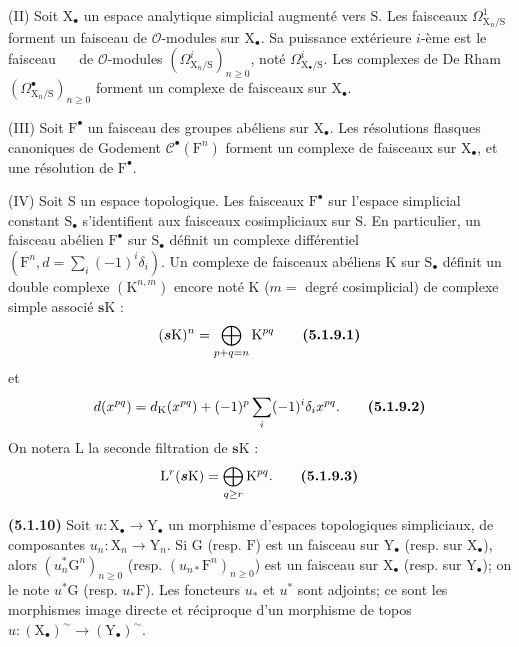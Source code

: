 \documentclass[11pt,leqno]{article}
\newcommand{\Page}[1]{\ifvmode\noindent\else\unskip\ \fi{\footnotesize\textcolor{gray}{[p.\,#1]}}\ \ignorespaces}
\begin{document}
(II) Soit \(\mathrm{X}_{\bullet}\) un espace analytique simplicial augmenté vers \(\mathrm{S}\). Les faisceaux \(\Omega^1_{\mathrm{X}_n/\mathrm{S}}\) forment un faisceau de \(\mathscr{O}\)-modules sur \(\mathrm{X}_{\bullet}\). Sa puissance extérieure \(i\)-ème est le faisceau
\Page{11}
de \(\mathscr{O}\)-modules \((\Omega^i_{\mathrm{X}_n/\mathrm{S}})_{n\geq0}\), noté \(\Omega^i_{\mathrm{X}_{\bullet}/\mathrm{S}}\). Les complexes de De Rham \((\Omega^{\bullet}_{\mathrm{X}_n/\mathrm{S}})_{n\geq0}\) forment un complexe de faisceaux sur \(\mathrm{X}_{\bullet}\).

(III) Soit \(\mathrm{F}^{\bullet}\) un faisceau des groupes abéliens sur \(\mathrm{X}_{\bullet}\). Les résolutions flasques canoniques de Godement \(\mathscr{C}^{\bullet}(\mathrm{F}^n)\) forment un complexe de faisceaux sur \(\mathrm{X}_{\bullet}\), et une résolution de \(\mathrm{F}^{\bullet}\).

(IV) Soit \(\mathrm{S}\) un espace topologique. Les faisceaux \(\mathrm{F}^{\bullet}\) sur l’espace simplicial constant \(\mathrm{S}_{\bullet}\) s’identifient aux faisceaux cosimpliciaux sur \(\mathrm{S}\). En particulier, un faisceau abélien \(\mathrm{F}^{\bullet}\) sur \(\mathrm{S}_{\bullet}\) définit un complexe différentiel \((\mathrm{F}^n,d=\sum\limits_i(-1)^i\delta_i)\). Un complexe de faisceaux abéliens \(\mathrm{K}\) sur \(\mathrm{S}_{\bullet}\) définit un double complexe \((\mathrm{K}^{n,m})\) encore noté \(\mathrm{K}\) (\(m=\) degré cosimplicial) de complexe simple associé \(\boldsymbol{s}\mathrm{K}\) :
\[
(\boldsymbol{s}\mathrm{K})^n
=\bigoplus_{p+q=n}\mathrm{K}^{pq}
\tag*{\textbf{(5.1.9.1)}}
\]
et
\[
d(x^{pq})=d_{\mathrm{K}}(x^{pq})
+(-1)^p\sum_i(-1)^i\delta_i x^{pq}.
\tag*{\textbf{(5.1.9.2)}}
\]
On notera \(\mathrm{L}\) la seconde filtration de \(\boldsymbol{s}\mathrm{K}\) :
\[
\mathrm{L}^r(\boldsymbol{s}\mathrm{K})
=\bigoplus_{q\geq r}\mathrm{K}^{pq}.
\tag*{\textbf{(5.1.9.3)}}
\]

\textbf{(5.1.10)} Soit \(u:\mathrm{X}_{\bullet}\to\mathrm{Y}_{\bullet}\) un morphisme d’espaces topologiques simpliciaux, de composantes \(u_n:\mathrm{X}_n\to\mathrm{Y}_n\). Si \(\mathrm{G}\) (resp. \(\mathrm{F}\)) est un faisceau sur \(\mathrm{Y}_{\bullet}\) (resp. sur \(\mathrm{X}_{\bullet}\)), alors \((u_n^*\mathrm{G}^n)_{n\geq0}\) (resp. \((u_{n*}\mathrm{F}^n)_{n\geq0}\)) est un faisceau sur \(\mathrm{X}_{\bullet}\) (resp. sur \(\mathrm{Y}_{\bullet}\)); on le note \(u^*\mathrm{G}\) (resp. \(u_*\mathrm{F}\)). Les foncteurs \(u_*\) et \(u^*\) sont adjoints; ce sont les morphismes image directe et réciproque d’un morphisme de topos \(u:(\mathrm{X}_{\bullet})^{\sim}\to(\mathrm{Y}_{\bullet})^{\sim}\).
\end{document}
